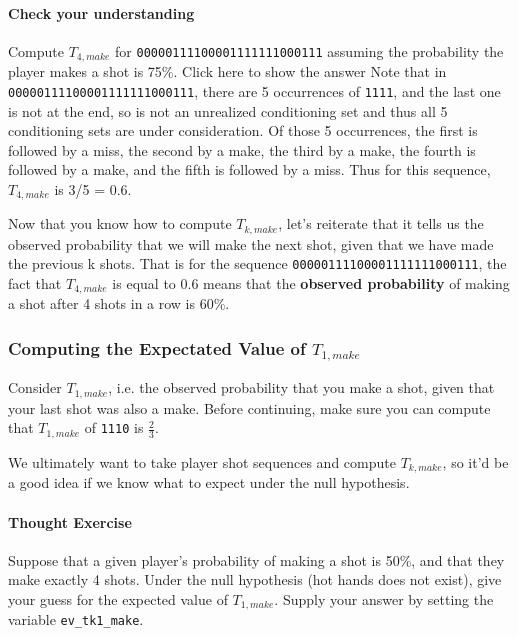 \documentclass[11pt]{article}
\begin{document}
\paragraph{Check your understanding}\label{check-your-understanding}

Compute \(T_{4, make}\) for \texttt{00000111100001111111000111} assuming
the probability the player makes a shot is 75\%. Click here to show the
answer Note that in \texttt{00000111100001111111000111}, there are 5
occurrences of \texttt{1111}, and the last one is not at the end, so is
not an unrealized conditioning set and thus all 5 conditioning sets are
under consideration. Of those 5 occurrences, the first is followed by a
miss, the second by a make, the third by a make, the fourth is followed
by a make, and the fifth is followed by a miss. Thus for this sequence,
\(T_{4, make}\) is 3/5 = 0.6.

Now that you know how to compute \(T_{k, make}\), let's reiterate that
it tells us the observed probability that we will make the next shot,
given that we have made the previous k shots. That is for the sequence
\texttt{00000111100001111111000111}, the fact that \(T_{4, make}\) is
equal to 0.6 means that the \textbf{observed probability} of making a
shot after 4 shots in a row is 60\%.

\subsubsection{\texorpdfstring{Computing the Expectated Value of
\(T_{1, make}\)}{Computing the Expectated Value of T\_\{1, make\}}}\label{computing-the-expectated-value-of-t_1-make}

Consider \(T_{1, make}\), i.e. the observed probability that you make a
shot, given that your last shot was also a make. Before continuing, make
sure you can compute that \(T_{1, make}\) of \texttt{1110} is
\(\frac{2}{3}\).

We ultimately want to take player shot sequences and compute
\(T_{k, make}\), so it'd be a good idea if we know what to expect under
the null hypothesis.

\paragraph{Thought Exercise}\label{thought-exercise}

Suppose that a given player's probability of making a shot is 50\%, and
that they make exactly 4 shots. Under the null hypothesis (hot hands
does not exist), give your guess for the expected value of
\(T_{1, make}\). Supply your answer by setting the variable
\texttt{ev\_tk1\_make}.
\end{document}
